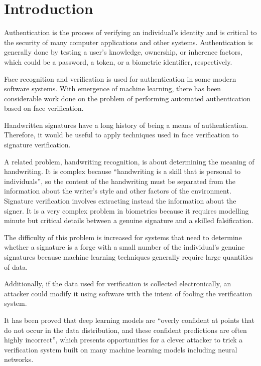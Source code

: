 \section{Introduction}\label{sec:introduction}

Authentication is the process of verifying an individual's identity and is critical to the security of many computer applications and other systems.
Authentication is generally done by testing a user's knowledge, ownership, or inherence factors, which could be a password, a token, or a biometric identifier, respectively\cite{authentication}.

Face recognition and verification is used for authentication in some modern software systems.
With emergence of machine learning, there has been considerable work done on the problem of performing automated authentication based on face verification\cite{sig_net}.

Handwritten signatures have a long history of being a means of authentication\cite{handwriting_survey}.
Therefore, it would be useful to apply techniques used in face verification to signature verification.

A related problem, handwriting recognition, is about determining the meaning of handwriting\cite{handwriting_survey}.
It is complex because ``handwriting is a skill that is personal to individuals'', so the content of the handwriting must be separated from the information about the writer's style and other factors of the environment\cite{handwriting_survey}.
Signature verification involves extracting instead the information about the signer.
It is a very complex problem in biometrics because it requires modelling minute but critical details between a genuine signature and a skilled falsification\cite{sig_net}.

The difficulty of this problem is increased for systems that need to determine whether a signature is a forge with a small number of the individual's genuine signatures because machine learning techniques generally require large quantities of data\cite{handwriting_survey}.

Additionally, if the data used for verification is collected electronically, an attacker could modify it using software with the intent of fooling the verification system.

It has been proved that deep learning models are ``overly confident at points that do not occur in the data distribution, and these confident predictions are often highly incorrect''\cite{goodfellow}, which presents opportunities for a clever attacker to trick a verification system built on many machine learning models including neural networks.
